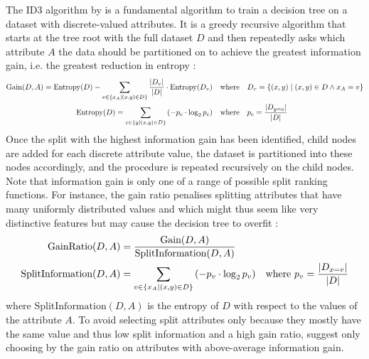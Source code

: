 The ID3 algorithm by \textcite{decision-trees-1986} is a fundamental algorithm to train a decision tree on a dataset with discrete-valued attributes. It is a greedy recursive algorithm that starts at the tree root with the full dataset $D$ and then repeatedly asks which attribute $A$ the data should be partitioned on to achieve the greatest information gain, i.e. the greatest reduction in entropy \cite{decision-trees-1986, machine-learning-1997}:
\begin{equation*}
    \begin{split}
        \text{Gain}(D, A) = \text{Entropy}(D) - \sum_{v \in \{ x_A \mathrel{|} (x, y) \in D \}}{\frac{|D_v|}{|D|} \cdot \text{Entropy}(D_v)} \quad &\text{where} \quad D_v = \{ (x, y) \mathrel{|} (x, y) \in D \land x_A = v \} \\
        \text{Entropy}(D) = \sum_{c \in \{ y \mathrel{|} (x, y) \in D \}}{\left( -p_c \cdot \log_{2}{p_c} \right)} \quad &\text{where} \quad p_c = \frac{|D_{y = c}|}{|D|}
    \end{split}
\end{equation*}
Once the split with the highest information gain has been identified, child nodes are added for each discrete attribute value, the dataset is partitioned into these nodes accordingly, and the procedure is repeated recursively on the child nodes. Note that information gain is only one of a range of possible split ranking functions. For instance, the gain ratio penalises splitting attributes that have many uniformly distributed values and which might thus seem like very distinctive features but may cause the decision tree to overfit \cite{decision-trees-1986, machine-learning-1997}:
\begin{equation*}
    \begin{split}
        \text{GainRatio}(D, A) &= \frac{\text{Gain}(D, A)}{\text{SplitInformation}(D, A)} \\
        \text{SplitInformation}(D, A) &= \sum_{v \in \{ x_A \mathrel{|} (x, y) \in D \}}{\left( -p_v \cdot \log_{2}{p_v} \right)} \quad \text{where } p_v = \frac{|D_{x = v}|}{|D|}
    \end{split}
\end{equation*}
where $\text{SplitInformation}(D, A)$ is the entropy of $D$ with respect to the values of the attribute $A$. To avoid selecting split attributes only because they mostly have the same value and thus low split information and a high gain ratio, \textcite{decision-trees-1986} suggest only choosing by the gain ratio on attributes with above-average information gain.

